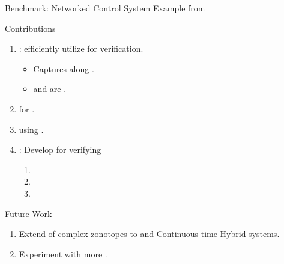 \begin{frame}{Benchmark: Networked Control System}
Example from
~\cite{wittenmark2002computer}
\end{frame}


\begin{frame}{Contributions}
\begin{enumerate}
\item {}: efficiently utilize  for verification.
%
\begin{itemize}
\item Captures  along .
\item {} and  are .
\end{itemize}
%
\pause
\item {} for .
\pause
\item {} using .
\pause
\item {}:  Develop  for verifying
%
\begin{enumerate}
\item {}
\item {}
\item {}
 \end{enumerate}
\end{enumerate}
\end{frame}


\begin{frame}{Future Work}
\begin{enumerate}
\item Extend  of complex zonotopes to  and {Continuous time Hybrid systems}.
\item Experiment with more .
\end{enumerate}
\end{frame}

